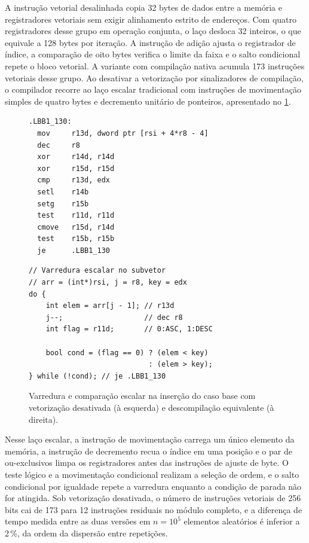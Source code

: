 \documentclass[12pt]{article}
\begin{document}
A instrução vetorial desalinhada copia 32 bytes de dados entre a memória e registradores vetoriais sem exigir alinhamento estrito de endereços. Com quatro registradores desse grupo em operação conjunta, o laço desloca 32 inteiros, o que equivale a 128 bytes por iteração. A instrução de adição ajusta o registrador de índice, a comparação de oito bytes verifica o limite da faixa e o salto condicional repete o bloco vetorial. A variante com compilação nativa acumula 173 instruções vetoriais desse grupo. Ao desativar a vetorização por sinalizadores de compilação, o compilador recorre ao laço escalar tradicional com instruções de movimentação simples de quatro bytes e decremento unitário de ponteiros, apresentado no \cref{fig:asm-novec}.

\begin{figure}[htbp]
\centering
\begin{minipage}[t]{0.48\textwidth}
\begin{verbatim}
.LBB1_130:
  mov     r13d, dword ptr [rsi + 4*r8 - 4]
  dec     r8
  xor     r14d, r14d
  xor     r15d, r15d
  cmp     r13d, edx
  setl    r14b
  setg    r15b
  test    r11d, r11d
  cmove   r15d, r14d
  test    r15b, r15b
  je      .LBB1_130
\end{verbatim}
\end{minipage}\hfill
\begin{minipage}[t]{0.48\textwidth}
\begin{verbatim}
// Varredura escalar no subvetor
// arr = (int*)rsi, j = r8, key = edx
do {
    int elem = arr[j - 1]; // r13d
    j--;                   // dec r8
    int flag = r11d;       // 0:ASC, 1:DESC

    bool cond = (flag == 0) ? (elem < key)
                            : (elem > key);
} while (!cond); // je .LBB1_130
\end{verbatim}
\end{minipage}
\caption{Varredura e comparação escalar na inserção do caso base com vetorização desativada (à esquerda) e descompilação equivalente (à direita).}
\label{fig:asm-novec}
\end{figure}

Nesse laço escalar, a instrução de movimentação carrega um único elemento da memória, a instrução de decremento recua o índice em uma posição e o par de ou-exclusivos limpa os registradores antes das instruções de ajuste de byte. O teste lógico e a movimentação condicional realizam a seleção de ordem, e o salto condicional por igualdade repete a varredura enquanto a condição de parada não for atingida. Sob vetorização desativada, o número de instruções vetoriais de 256 bits cai de 173 para 12 instruções residuais no módulo completo, e a diferença de tempo medida entre as duas versões em $n = 10^5$ elementos aleatórios é inferior a 2\,\%, da ordem da dispersão entre repetições.
\end{document}
